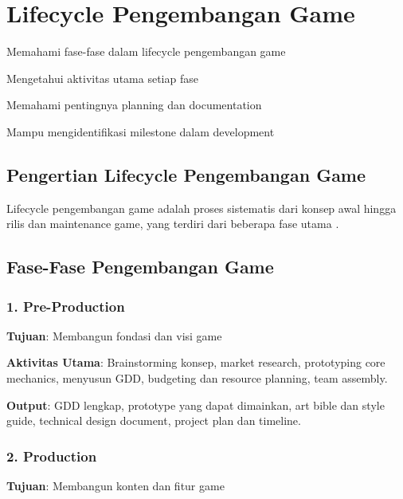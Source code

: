 \section{Lifecycle Pengembangan Game}

\begin{learningoutcomes}
\item Memahami fase-fase dalam lifecycle pengembangan game
\item Mengetahui aktivitas utama setiap fase
\item Memahami pentingnya planning dan documentation
\item Mampu mengidentifikasi milestone dalam development
\end{learningoutcomes}

\subsection{Pengertian Lifecycle Pengembangan Game}

\begin{definisi}
Lifecycle pengembangan game adalah proses sistematis dari konsep awal hingga rilis dan maintenance game, yang terdiri dari beberapa fase utama \cite{Gregory2018}.
\end{definisi}

\subsection{Fase-Fase Pengembangan Game}

\subsubsection{1. Pre-Production}

\textbf{Tujuan}: Membangun fondasi dan visi game

\textbf{Aktivitas Utama}: Brainstorming konsep, market research, prototyping core mechanics, menyusun GDD, budgeting dan resource planning, team assembly.

\textbf{Output}: GDD lengkap, prototype yang dapat dimainkan, art bible dan style guide, technical design document, project plan dan timeline.

\subsubsection{2. Production}

\textbf{Tujuan}: Membangun konten dan fitur game

